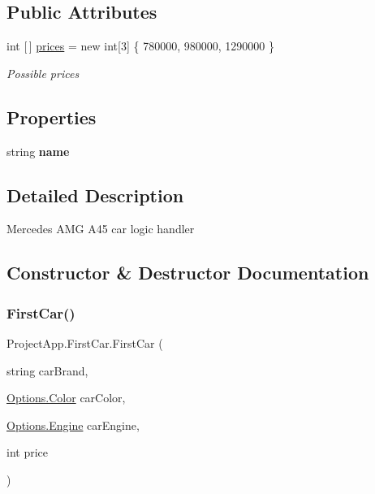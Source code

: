 \subsection*{Public Attributes}
\begin{DoxyCompactItemize}
\item 
int \mbox{[}$\,$\mbox{]} \mbox{\hyperlink{class_project_app_1_1_first_car_acba0828ff81bed0ec72f7d5d786fbc8d}{prices}} = new int\mbox{[}3\mbox{]} \{ 780000, 980000, 1290000 \}
\begin{DoxyCompactList}\small\item\em Possible prices \end{DoxyCompactList}\end{DoxyCompactItemize}
\subsection*{Properties}
\begin{DoxyCompactItemize}
\item 
\mbox{\label{class_project_app_1_1_first_car_a867b6b95d0d0a597322882e21f21572e}} 
string {\bfseries name}
\end{DoxyCompactItemize}


\subsection{Detailed Description}
Mercedes A\+MG A45 car logic handler 



\subsection{Constructor \& Destructor Documentation}
\mbox{\label{class_project_app_1_1_first_car_aec81c88fba266b07f24926e47e29d55c}} 
\subsubsection{\texorpdfstring{First\+Car()}{FirstCar()}\hspace{0.1cm}{\footnotesize\ttfamily [1/2]}}
{\footnotesize\ttfamily Project\+App.\+First\+Car.\+First\+Car (\begin{DoxyParamCaption}\item[{string}]{car\+Brand,  }\item[{\mbox{\hyperlink{class_project_app_1_1_options_aaa68b08af20deeebf73e6bc6de725c44}{Options.\+Color}}}]{car\+Color,  }\item[{\mbox{\hyperlink{class_project_app_1_1_options_a95e313182e8122da719f7c8caefcc88d}{Options.\+Engine}}}]{car\+Engine,  }\item[{int}]{price }\end{DoxyParamCaption})}



